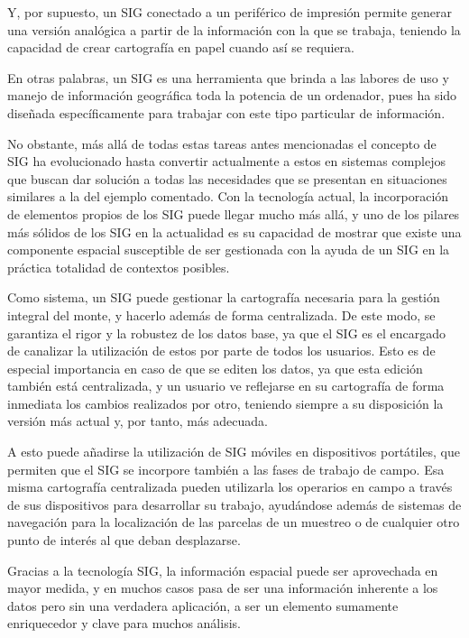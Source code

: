 Y, por supuesto, un SIG conectado a un periférico de impresión permite generar una versión analógica a partir de la información con la que se trabaja, teniendo la capacidad de crear cartografía en papel cuando así se requiera.

En otras palabras, un SIG es una herramienta que brinda a las labores de uso y manejo de información geográfica toda la potencia de un ordenador, pues ha sido diseñada específicamente para trabajar con este tipo particular de información.

No obstante, más allá de todas estas tareas antes mencionadas el concepto de SIG ha evolucionado hasta convertir actualmente a estos en sistemas complejos que buscan dar solución a todas las necesidades que se presentan en situaciones similares a la del ejemplo comentado. Con la tecnología actual, la incorporación de elementos propios de los SIG puede llegar mucho más allá, y uno de los pilares más sólidos de los SIG en la actualidad es su capacidad de mostrar que existe una componente espacial susceptible de ser gestionada con la ayuda de un SIG en la práctica totalidad de contextos posibles.

Como sistema, un SIG puede gestionar la cartografía necesaria para la gestión integral del monte, y hacerlo además de forma centralizada. De este modo, se garantiza el rigor y la robustez de los datos base, ya que el SIG es el encargado de canalizar la utilización de estos por parte de todos los usuarios. Esto es de especial importancia en caso de que se editen los datos, ya que esta edición también está centralizada, y un usuario ve reflejarse en su cartografía de forma inmediata los cambios realizados por otro, teniendo siempre a su disposición la versión más actual y, por tanto, más adecuada.
 
A esto puede añadirse la utilización de SIG móviles en dispositivos portátiles, que permiten que el SIG se incorpore también a las fases de trabajo de campo. Esa misma cartografía centralizada pueden utilizarla los operarios en campo a través de sus dispositivos para desarrollar su trabajo, ayudándose además de sistemas de navegación para la localización de las parcelas de un muestreo o de cualquier otro punto de interés al que deban desplazarse. 

Gracias a la tecnología SIG, la información espacial puede ser aprovechada en mayor medida, y en muchos casos pasa de ser una información inherente a los datos pero sin una verdadera aplicación, a ser un elemento sumamente enriquecedor y clave para muchos análisis. 


